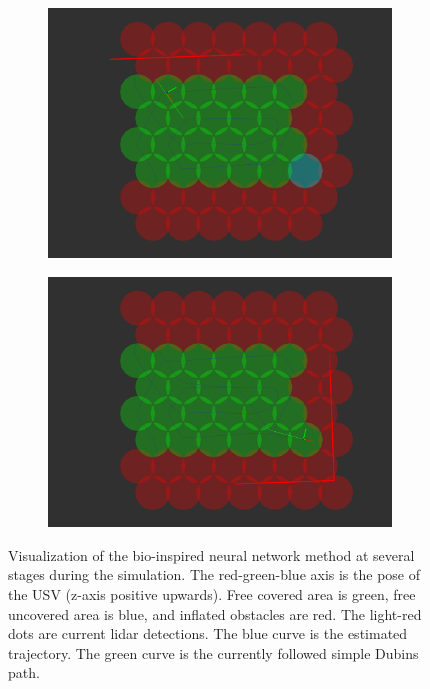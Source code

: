 \begin{figure}[h!]
{\begin{subfigure}[b]{0.5\textwidth}
		\includegraphics[height=0.20\textheight,width=1\textwidth]{fig/simulations/binn_alg4}
		\caption{}
	\end{subfigure}
	\begin{subfigure}[b]{0.5\textwidth}
		\centering
		\includegraphics[height=0.20\textheight,width=1\textwidth]{fig/simulations/binn_alg5}
		\caption{}
	\end{subfigure}
	}
	\caption[Visualization of the bio-inspired neural network method at several stages during the simulation.]{Visualization of the bio-inspired neural network method at several stages during the simulation. The red-green-blue axis is the pose of the USV (z-axis positive upwards). Free covered area is green, free uncovered area is blue, and inflated obstacles are red. The light-red dots are current lidar detections. The blue curve is the estimated trajectory. The green curve is the currently followed simple Dubins path.}
	\label{fig:binn_res}
\end{figure}


